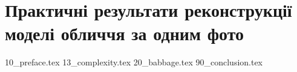 \chapter{Практичні результати реконструкції моделі обличчя за одним фото}

{10_preface.tex}
{13_complexity.tex}
{20_babbage.tex}
{90_conclusion.tex}
